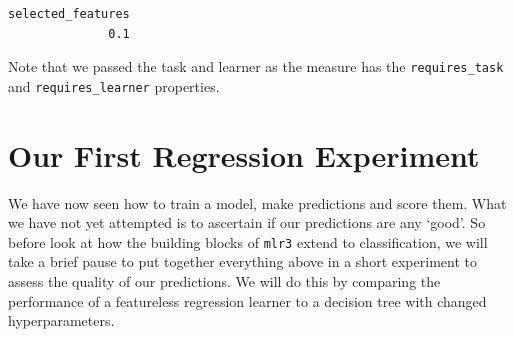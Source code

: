 \begin{verbatim}
selected_features 
              0.1 
\end{verbatim}

Note that we passed the task and learner as the measure has the
\texttt{requires\_task} and \texttt{requires\_learner} properties.

\hypertarget{sec-basics-regr-experiment}{%
\section{Our First Regression
Experiment}\label{sec-basics-regr-experiment}}

We have now seen how to train a model, make predictions and score them.
What we have not yet attempted is to ascertain if our predictions are
any `good'. So before look at how the building blocks of \texttt{mlr3}
extend to classification, we will take a brief pause to put together
everything above in a short experiment to assess the quality of our
predictions. We will do this by comparing the performance of a
featureless regression learner to a decision tree with changed
hyperparameters.

\begin{Shaded}
\begin{Highlighting}[]
\NormalTok{(}\NormalTok{)}
\OtherTok{=} \NormalTok{(}\NormalTok{)}
\OtherTok{=} 
\OtherTok{=} \NormalTok{(}\NormalTok{)}
\OtherTok{=} \NormalTok{(}\NormalTok{, } \NormalTok{, } \NormalTok{)}
\OtherTok{=} \NormalTok{(}\NormalTok{(}\NormalTok{, }\NormalTok{))}
\SpecialCharTok{$}\SpecialCharTok{$}
\SpecialCharTok{$}\SpecialCharTok{$}
\SpecialCharTok{$}\SpecialCharTok{$}\SpecialCharTok{$}
\end{Highlighting}
\end{Shaded}

